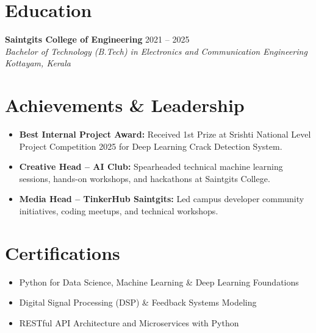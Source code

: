 \documentclass[letterpaper,9.5pt]{article}
\newcommand{\resumeItem}[1]{
  \item\small{
    {#1 \vspace{-2.5pt}}
  }
}
\begin{document}
\section{Education}
  \textbf{Saintgits College of Engineering} \hfill 2021 -- 2025 \\
  \textit{\small Bachelor of Technology (B.Tech) in Electronics and Communication Engineering} \hfill \textit{\small Kottayam, Kerala}
\vspace{-2pt}

\section{Achievements \& Leadership}
\begin{itemize}
  \resumeItem{\textbf{Best Internal Project Award:} Received 1st Prize at Srishti National Level Project Competition 2025 for Deep Learning Crack Detection System.}
  \resumeItem{\textbf{Creative Head -- AI Club:} Spearheaded technical machine learning sessions, hands-on workshops, and hackathons at Saintgits College.}
  \resumeItem{\textbf{Media Head -- TinkerHub Saintgits:} Led campus developer community initiatives, coding meetups, and technical workshops.}
\end{itemize}
\vspace{-2pt}

\section{Certifications}
\begin{itemize}
  \resumeItem{Python for Data Science, Machine Learning \& Deep Learning Foundations}
  \resumeItem{Digital Signal Processing (DSP) \& Feedback Systems Modeling}
  \resumeItem{RESTful API Architecture and Microservices with Python}
\end{itemize}
\end{document}
